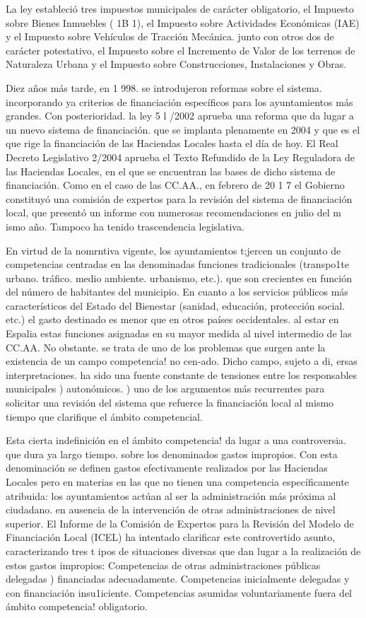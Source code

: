 \documentclass[10pt,a4paper]{article}
\begin{document}
{La ley estableció tres impuestos municipales de carácter obligatorio, el Impuesto sobre Bienes Inmuebles ( 1B 1), el Impuesto sobre Actividades Económicas (IAE) y el Impuesto sobre Vehículos de Tracción Mecánica. junto con otros dos de carácter potestativo, el Impuesto sobre el Incremento de Valor de los terrenos de Naturaleza Urbana y el Impuesto sobre Construcciones, Instalaciones y Obras.

Diez años más tarde, en 1 998. se introdujeron reformas sobre el sistema. incorporando ya criterios de financiación específicos para los ayuntamientos más grandes. Con posterioridad. la ley 5 l /2002 aprueba una reforma que da lugar a un nuevo sistema de financiación. que se implanta plenamente en 2004 y que es el que rige la financiación de las Haciendas Locales hasta el día de hoy. El Real Decreto Legislativo 2/2004 aprueba el Texto Refundido de la Ley Reguladora de las Haciendas Locales, en el que se encuentran las bases de dicho sistema de financiación. Como en el caso de las CC.AA., en febrero de 20 1 7 el Gobierno constituyó una comisión de expertos para la revisión del sistema de financiación local, que presentó un informe con numerosas recomendaciones en julio del m ismo año. Tampoco ha tenido trascendencia legislativa.

En virtud de la nomrntiva vigente, los ayuntamientos t;jercen un conjunto de competencias centradas en las denominadas funciones tradicionales (transpo1te urbano. tráfico. medio ambiente. urbanismo, etc.). que son crecientes en función del número de habitantes del municipio. En cuanto a los servicios públicos más característicos del Estado del Bienestar (sanidad, educación, protección social. etc.) el gasto destinado es menor que en otros países occidentales. al estar en Espalia estas funciones asignadas en su mayor medida al nivel intermedio de las CC.AA. No obstante. se trata de uno de los problemas que surgen ante la existencia de un campo competencia! no cen-ado. Dicho campo, sujeto a di, ersas interpretaciones. ha sido una fuente constante de tensiones entre los responsables municipales ) autonómicos. ) uno de los argumentos más recurrentes para solicitar una revisión del sistema que refuerce la financiación local al mismo tiempo que clarifique el ámbito competencial.

Esta cierta indefinición en el ámbito competencia! da lugar a una controversia. que dura ya largo tiempo. sobre los denominados gastos impropios. Con esta denominación se definen gastos efectivamente realizados por las Haciendas Locales pero en materias en las que no tienen una competencia específicamente atribuida: los ayuntamientos actúan al ser la administración más próxima al ciudadano. en ausencia de la intervención de otras administraciones de nivel superior. El Informe de la Comisión de Expertos para la Revisión del Modelo de Financiación Local (ICEL) ha intentado clarificar este controvertido asunto, caracterizando tres t ipos de situaciones diversas que dan lugar a la realización de estos gastos impropios: 
Competencias de otras administraciones públicas delegadas ) financiadas adecuadamente.
Competencias inicialmente delegadas y con financiación insu1iciente.
Competencias asumidas voluntariamente fuera del ámbito competencia! obligatorio.

}
\end{document}

